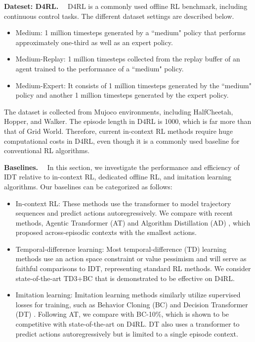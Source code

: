 \noindent\textbf{Dateset: D4RL.}~~
D4RL \cite{13} is a commonly used offline RL benchmark, including continuous control tasks. The different dataset settings are described below.

\begin{itemize}
    \item Medium: 1 million timesteps generated by a ``medium" policy that performs approximately one-third as well as an expert policy.
    \item Medium-Replay: 1 million timesteps collected from the replay buffer of an agent trained to the performance of a ``medium" policy.
    \item Medium-Expert: It consists of 1 million timesteps generated by the ``medium" policy and another 1 million timesteps generated by the expert policy.
\end{itemize}

The dataset is collected from Mujoco environments, including HalfCheetah, Hopper, and Walker. The episode length in D4RL is 1000, which is far more than that of Grid World. Therefore, current in-context RL methods require huge computational costs in D4RL, even though it is a commonly used baseline for conventional RL algorithms.




\noindent\textbf{Baselines.}~~
In this section, we investigate the performance and efficiency of IDT relative to in-context RL, dedicated offline RL, and imitation learning algorithms. Our baselines can be categorized as follows:

\begin{itemize}
    \item In-context RL: These methods use the transformer to model trajectory sequences and predict actions autoregressively. We compare with recent methods, Agentic Transformer (AT) \cite{1} and Algorithm Distillation (AD) \cite{8}, which proposed across-episodic contexts with the smallest actions.
    \vspace{-2pt}
    \item Temporal-difference learning: Most temporal-difference (TD) learning methods use an action space constraint or value pessimism and will serve as faithful comparisons to IDT, representing standard RL methods. We consider state-of-the-art TD3+BC \cite{29} that is demonstrated to be effective on D4RL.
    \vspace{-2pt}
    \item Imitation learning: Imitation learning methods similarly utilize supervised losses for training, such as Behavior Cloning (BC) \cite{30} and Decision Transformer (DT) \cite{2}. Following AT, we compare with BC-10$\%$, which is shown to be competitive with state-of-the-art on D4RL. DT also uses a transformer to predict actions autoregressively but is limited to a single episode context.
\end{itemize}

